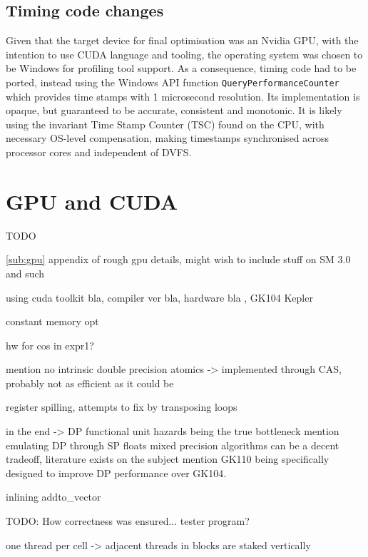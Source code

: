 \documentclass[11pt, oneside, a4paper]{article}
\begin{document}
\subsection{Timing code changes} %
\label{sub:timing_code_changes}
Given that the target device for final optimisation was an Nvidia GPU, with the intention to use CUDA language and tooling, the operating system was chosen to be Windows for profiling tool support. As a consequence, timing code had to be ported, instead using the Windows API function \texttt{QueryPerformanceCounter}\cite{QPC} which provides time stamps with 1 microsecond resolution. Its implementation is opaque, but guaranteed to be accurate, consistent and monotonic. It is likely using the invariant Time Stamp Counter (TSC) found on the CPU, with necessary OS-level compensation, making timestamps synchronised across processor cores and independent of DVFS.





\section{GPU and CUDA} %
\label{sec:gpu_and_cuda}

TODO

\ref{sub:gpu} appendix of rough gpu details, might wish to include stuff on SM 3.0 and such

using cuda toolkit bla, compiler ver bla, hardware bla , GK104 Kepler

constant memory opt

hw for cos in expr1? 

mention no intrinsic double precision atomics -> implemented through CAS, probably not as efficient as it could be

register spilling, attempts to fix by transposing loops

in the end -> DP functional unit hazards being the true bottleneck
mention emulating DP through SP floats
mixed precision algorithms can be a decent tradeoff, literature exists on the subject
mention GK110 being specifically designed to improve DP performance over GK104.

inlining addto\_vector

TODO: How correctness was ensured... tester program?

one thread per cell -> adjacent threads in blocks are staked vertically
\end{document}

